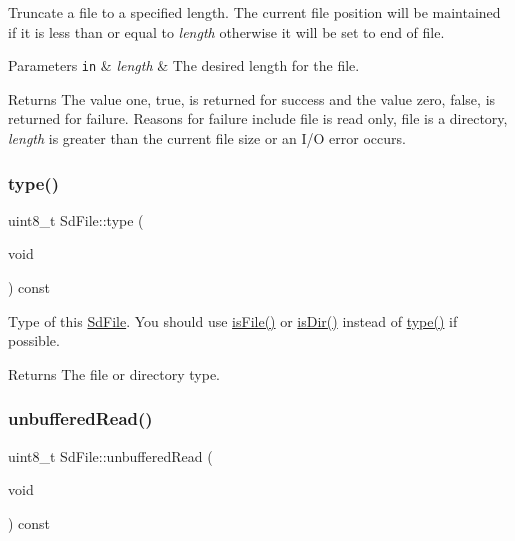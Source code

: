 Truncate a file to a specified length. The current file position will be maintained if it is less than or equal to {\itshape length} otherwise it will be set to end of file.


\begin{DoxyParams}[1]{Parameters}
\mbox{\tt in}  & {\em length} & The desired length for the file.\\
\hline
\end{DoxyParams}
\begin{DoxyReturn}{Returns}
The value one, true, is returned for success and the value zero, false, is returned for failure. Reasons for failure include file is read only, file is a directory, {\itshape length} is greater than the current file size or an I/O error occurs. 
\end{DoxyReturn}
\mbox{\label{class_sd_file_a2da736b480e64ec2142687fb49871ada}} 
\subsubsection{\texorpdfstring{type()}{type()}}
{\footnotesize\ttfamily uint8\+\_\+t Sd\+File\+::type (\begin{DoxyParamCaption}\item[{void}]{ }\end{DoxyParamCaption}) const\hspace{0.3cm}{\ttfamily [inline]}}

Type of this \hyperlink{class_sd_file}{Sd\+File}. You should use \hyperlink{class_sd_file_ad9ca9b2b519a933c25e8f893ee0201b6}{is\+File()} or \hyperlink{class_sd_file_a564e69a08c11f20e66eb18c38e24b748}{is\+Dir()} instead of \hyperlink{class_sd_file_a2da736b480e64ec2142687fb49871ada}{type()} if possible.

\begin{DoxyReturn}{Returns}
The file or directory type. 
\end{DoxyReturn}
\mbox{\label{class_sd_file_a151bbc9fa7787b67f3d4a3574f9bc9e3}} 
\subsubsection{\texorpdfstring{unbuffered\+Read()}{unbufferedRead()}}
{\footnotesize\ttfamily uint8\+\_\+t Sd\+File\+::unbuffered\+Read (\begin{DoxyParamCaption}\item[{void}]{ }\end{DoxyParamCaption}) const\hspace{0.3cm}{\ttfamily [inline]}}

